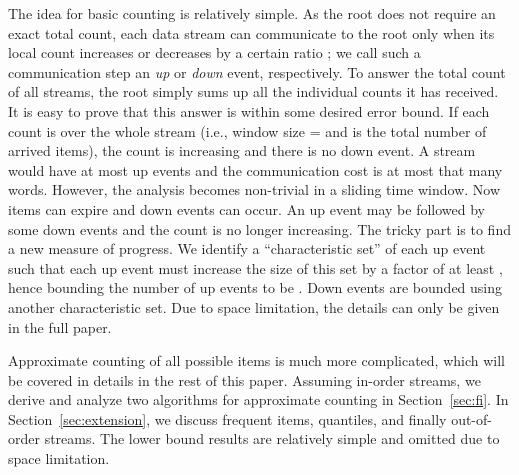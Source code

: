 \documentclass[proceedings]{stacs}
\theoremstyle{definition}\newtheorem{fact}{Fact}
\begin{document}
\vspace{0.5ex}
The idea for basic counting is relatively simple.
As the root does not require an exact total count, each data
stream can communicate to the root only when its local count
increases or decreases by a certain ratio ; we call such a
communication step an \emph{up} or \emph{down} event, respectively.
To answer the total count of all streams, the root simply sums up
all the individual counts it has received. It is easy to prove that
this answer is within some desired error bound.
If each count is over the whole stream (i.e., window size = 
and   { is the total number of arrived items}),
the count is increasing and there is no down event.
A stream would have at most  up events
and the communication cost is at most that many words.
However, the analysis becomes non-trivial in a sliding time window.
Now items can expire and down events can occur.
An up event may be followed by some
down events and the count is no longer increasing.
The tricky part is to find a new measure of progress.
We identify a ``characteristic set''
of each up event such that
each up event must increase the size of
this set by a factor of at least ,
hence bounding the number of up events to be .
Down events are bounded using another characteristic set.
Due to space limitation, the details can only be given in the full paper.










Approximate counting of all possible items is much more complicated,
which will be covered in details in the rest of this paper.
Assuming in-order streams, we derive and analyze two algorithms
 for approximate counting in Section~\ref{sec:fi}.
In Section~\ref{sec:extension}, we discuss frequent items, quantiles, and
finally out-of-order streams.
The lower bound results are relatively simple and omitted due to space limitation.
\end{document}

